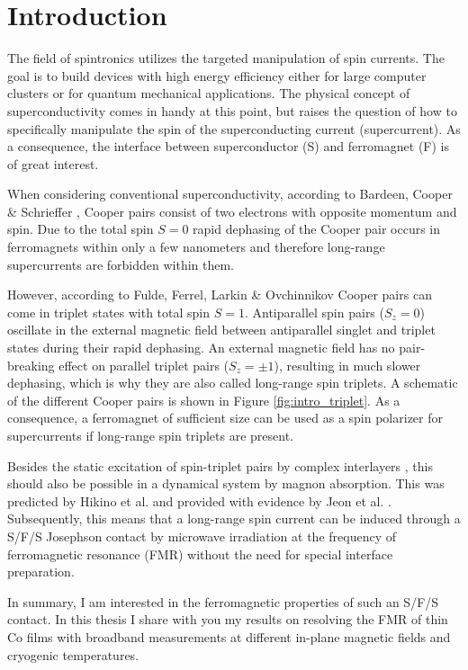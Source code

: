 \chapter{Introduction}

The field of spintronics utilizes the targeted manipulation of spin currents. The goal is to build devices with high energy efficiency either for large computer clusters or for quantum mechanical applications. The physical concept of superconductivity comes in handy at this point, but raises the question of how to specifically manipulate the spin of the superconducting current (supercurrent). As a consequence, the interface between superconductor (S) and ferromagnet (F) is of great interest.

When considering conventional superconductivity, according to Bardeen, Cooper \& {Schrieffer\,\,\cite{BCS1957}}, Cooper pairs consist of two electrons with opposite momentum and spin. Due to the total spin $S=0$ rapid dephasing of the Cooper pair occurs in ferromagnets within only a few nanometers and therefore long-range supercurrents are forbidden within them.

However, according to Fulde, Ferrel, Larkin \& Ovchinnikov \cite{FF1964, LO1969} Cooper pairs can come in triplet states with total spin $S=1$. Antiparallel spin pairs ($S_z=0$) oscillate in the external magnetic field between antiparallel singlet and triplet states during their rapid dephasing. An external magnetic field has no pair-breaking effect on parallel triplet pairs ($S_z=\pm 1$), resulting in much slower dephasing, which is why they are also called long-range spin triplets. A schematic of the different Cooper pairs is shown in Figure \ref{fig:intro_triplet}. As a consequence, a ferromagnet of sufficient size can be used as a spin polarizer for supercurrents if long-range spin triplets are present. 

Besides the static excitation of spin-triplet pairs by complex interlayers  \cite{Keitzer2006, Robinson2010, Kalcheim2014, eschrig2015}, this should also be possible in a dynamical system by magnon absorption. This was predicted by Hikino et al. \cite{Hikino2007,Hikino_2011} and provided with evidence by Jeon et al. \cite{Jeon2018}. Subsequently, this means that a long-range spin current can be induced through a S/F/S Josephson contact by microwave irradiation at the frequency of ferromagnetic resonance (FMR) without the need for special interface preparation. 

In summary, I am interested in the ferromagnetic properties of such an S/F/S contact. In this thesis I share with you my results on resolving the FMR of thin Co films with broadband measurements at different in-plane magnetic fields and cryogenic temperatures.

